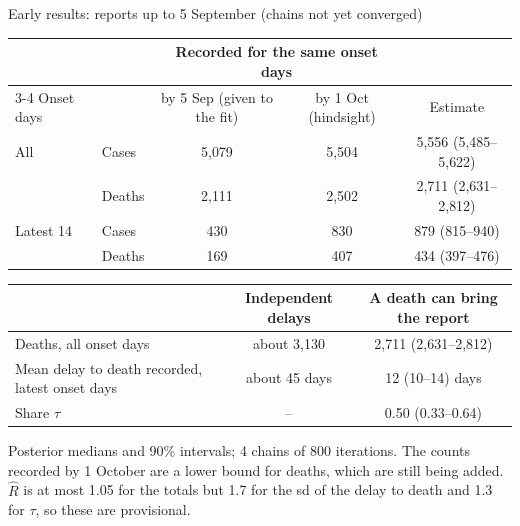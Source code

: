 \documentclass[aspectratio=169,9pt]{beamer}
\begin{document}
\begin{frame}{Early results: reports up to 5 September (chains not yet converged)}
\centering
\renewcommand{\arraystretch}{1.25}
\begin{tabular}{llccc}
\toprule
 & & \multicolumn{2}{c}{Recorded for the same onset days} & \\
\cmidrule(lr){3-4}
Onset days & & by 5 Sep (given to the fit) & by 1 Oct (hindsight) & Estimate \\
\midrule
All & Cases & 5{,}079 & 5{,}504 & 5{,}556 (5{,}485--5{,}622) \\
 & Deaths & 2{,}111 & 2{,}502 & 2{,}711 (2{,}631--2{,}812) \\
Latest 14 & Cases & 430 & 830 & 879 (815--940) \\
 & Deaths & 169 & 407 & 434 (397--476) \\
\bottomrule
\end{tabular}

\medskip
\begin{tabular}{lcc}
\toprule
 & Independent delays & A death can bring the report \\
\midrule
Deaths, all onset days & about 3{,}130 & 2{,}711 (2{,}631--2{,}812) \\
Mean delay to death recorded, latest onset days & about 45 days & 12 (10--14) days \\
Share $\tau$ & -- & 0.50 (0.33--0.64) \\
\bottomrule
\end{tabular}

\medskip
\begin{minipage}{0.9\textwidth}
\small Posterior medians and 90\% intervals; 4 chains of 800 iterations.
The counts recorded by 1 October are a lower bound for deaths, which are
still being added. $\hat{R}$ is at most 1.05 for the totals but 1.7 for the
sd of the delay to death and 1.3 for $\tau$, so these are provisional.
\end{minipage}
\end{frame}
\end{document}
